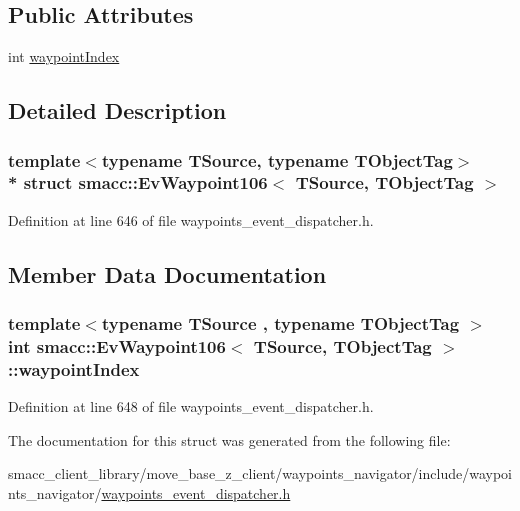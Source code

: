 \subsection*{Public Attributes}
\begin{DoxyCompactItemize}
\item 
int \hyperlink{structsmacc_1_1EvWaypoint106_a1359b711ee3afdc0d7f41ee3f86a5ce3}{waypoint\+Index}
\end{DoxyCompactItemize}


\subsection{Detailed Description}
\subsubsection*{template$<$typename T\+Source, typename T\+Object\+Tag$>$\\*
struct smacc\+::\+Ev\+Waypoint106$<$ T\+Source, T\+Object\+Tag $>$}



Definition at line 646 of file waypoints\+\_\+event\+\_\+dispatcher.\+h.



\subsection{Member Data Documentation}
\subsubsection[{\texorpdfstring{waypoint\+Index}{waypointIndex}}]{\setlength{\rightskip}{0pt plus 5cm}template$<$typename T\+Source , typename T\+Object\+Tag $>$ int {\bf smacc\+::\+Ev\+Waypoint106}$<$ T\+Source, T\+Object\+Tag $>$\+::waypoint\+Index}\hypertarget{structsmacc_1_1EvWaypoint106_a1359b711ee3afdc0d7f41ee3f86a5ce3}{}\label{structsmacc_1_1EvWaypoint106_a1359b711ee3afdc0d7f41ee3f86a5ce3}


Definition at line 648 of file waypoints\+\_\+event\+\_\+dispatcher.\+h.



The documentation for this struct was generated from the following file\+:\begin{DoxyCompactItemize}
\item 
smacc\+\_\+client\+\_\+library/move\+\_\+base\+\_\+z\+\_\+client/waypoints\+\_\+navigator/include/waypoints\+\_\+navigator/\hyperlink{waypoints__event__dispatcher_8h}{waypoints\+\_\+event\+\_\+dispatcher.\+h}\end{DoxyCompactItemize}
